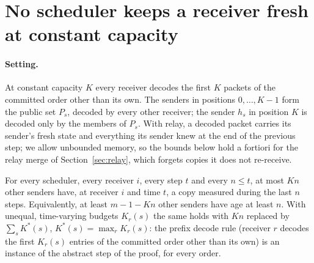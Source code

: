 
\section{No scheduler keeps a receiver fresh at constant capacity}\label{sec:floor}

\paragraph{Setting.} At constant capacity $K$ every receiver decodes the first $K$ packets of the committed order other
than its own. The senders in positions $0,\dots,K-1$ form the public set $P_s$, decoded by every other receiver; the
sender $h_s$ in position $K$ is decoded only by the members of $P_s$. With relay, a decoded packet carries its sender's
fresh state and everything its sender knew at the end of the previous step; we allow unbounded memory, so the bounds
below hold a fortiori for the relay merge of Section~\ref{sec:relay}, which forgets copies it does not re-receive.

\begin{claim}\label{cl:floor}
For every scheduler, every receiver $i$, every step $t$ and every $n\le t$, at most $Kn$ other senders have, at receiver
$i$ and time $t$, a copy measured during the last $n$ steps. Equivalently, at least $m-1-Kn$ other senders have age at
least $n$. 
With unequal, time-varying budgets $K_r(s)$ the same holds with $Kn$ replaced by $\sum_{s}K^*(s)$, $K^*(s)=\max_r K_r(s)$:
the prefix decode rule (receiver $r$ decodes the first $K_r(s)$ entries of the committed order other than its own) is an
instance of the abstract step of the proof, for every order. 
\end{claim}

